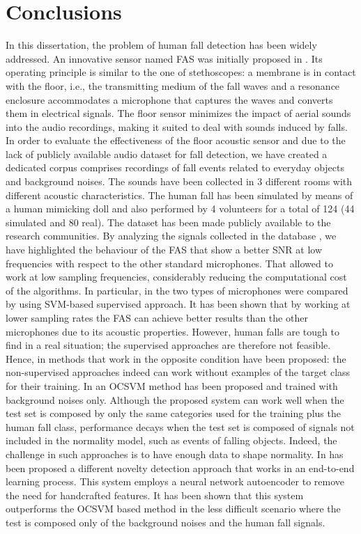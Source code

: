  
\chapter{Conclusions}

In this dissertation, the problem of human fall detection has been widely addressed. An innovative sensor named FAS was initially proposed in . Its operating principle is similar to the one of stethoscopes: a membrane is in contact with the floor, i.e., the transmitting medium of the fall waves and a resonance enclosure accommodates a microphone that captures the waves and converts them in electrical signals. The floor sensor minimizes the impact of aerial sounds into the audio recordings, making it suited to deal with sounds induced by falls. In order to evaluate the effectiveness of the floor acoustic sensor and due to the lack of publicly available audio dataset for fall detection, we have created a dedicated corpus comprises recordings of fall events related to everyday objects and background noises. The sounds have been collected in 3 different rooms with different acoustic characteristics. The human fall has been simulated by means of a human mimicking doll and also performed by 4 volunteers for a total of 124 (44 simulated and 80 real). The dataset has been made publicly available to the research communities. By analyzing the signals collected in the database , we have highlighted the behaviour of the FAS that show a better SNR at low frequencies with respect to the other standard microphones. That allowed to work at low sampling frequencies, considerably reducing the computational cost of the algorithms. In particular, in  the two types of microphones were compared by using SVM-based supervised approach. It has been shown that by working at lower sampling rates the FAS can achieve better results than the other microphones due to its acoustic properties. However, human falls are tough to find in a real situation; the supervised approaches are therefore not feasible. Hence, in  methods that work in the opposite condition have been proposed: the non-supervised approaches indeed can work without examples of the target class for their training. In  an OCSVM method has been proposed and trained with background noises only. Although the proposed system can work well when the test set is composed by only the same categories used for the training plus the human fall class, performance decays when the test set is composed of signals not included in the normality model, such as events of falling objects. Indeed, the challenge in such approaches is to have enough data to shape normality. In  has been proposed a different novelty detection approach that works in an end-to-end learning process. This system employs a neural network autoencoder to remove the need for handcrafted features. It has been shown that this system outperforms the OCSVM based method in the less difficult scenario where the test is composed only of the background noises and the human fall signals. 
